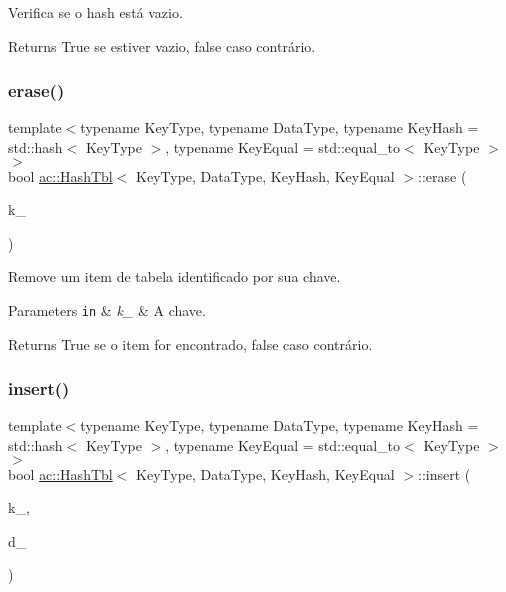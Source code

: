 Verifica se o hash está vazio. 

\begin{DoxyReturn}{Returns}
True se estiver vazio, false caso contrário. 
\end{DoxyReturn}
\mbox{\label{classac_1_1HashTbl_af3dd2fb806673ec64a9beec2c1fd7610}} 
\subsubsection{\texorpdfstring{erase()}{erase()}}
{\footnotesize\ttfamily template$<$typename Key\+Type, typename Data\+Type, typename Key\+Hash = std\+::hash$<$ Key\+Type $>$, typename Key\+Equal = std\+::equal\+\_\+to$<$ Key\+Type $>$$>$ \\
bool \hyperlink{classac_1_1HashTbl}{ac\+::\+Hash\+Tbl}$<$ Key\+Type, Data\+Type, Key\+Hash, Key\+Equal $>$\+::erase (\begin{DoxyParamCaption}\item[{const Key\+Type}]{k\+\_\+ }\end{DoxyParamCaption})\hspace{0.3cm}{\ttfamily [inline]}}



Remove um item de tabela identificado por sua chave. 


\begin{DoxyParams}[1]{Parameters}
\mbox{\tt in}  & {\em k\+\_\+} & A chave. \\
\hline
\end{DoxyParams}
\begin{DoxyReturn}{Returns}
True se o item for encontrado, false caso contrário. 
\end{DoxyReturn}
\mbox{\label{classac_1_1HashTbl_a219a559a1a07170cc0679c5d1dfb3758}} 
\subsubsection{\texorpdfstring{insert()}{insert()}}
{\footnotesize\ttfamily template$<$typename Key\+Type, typename Data\+Type, typename Key\+Hash = std\+::hash$<$ Key\+Type $>$, typename Key\+Equal = std\+::equal\+\_\+to$<$ Key\+Type $>$$>$ \\
bool \hyperlink{classac_1_1HashTbl}{ac\+::\+Hash\+Tbl}$<$ Key\+Type, Data\+Type, Key\+Hash, Key\+Equal $>$\+::insert (\begin{DoxyParamCaption}\item[{const Key\+Type \&}]{k\+\_\+,  }\item[{const Data\+Type \&}]{d\+\_\+ }\end{DoxyParamCaption})\hspace{0.3cm}{\ttfamily [inline]}}



